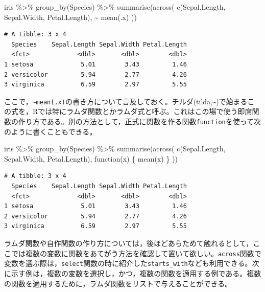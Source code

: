 \documentclass[
  a4paper,
]{ltjsbook}
\newenvironment{Shaded}{\begin{snugshade}}{\end{snugshade}}
\newcommand{\ControlFlowTok}[1]{\textcolor[rgb]{0.00,0.23,0.31}{#1}}
\newcommand{\FunctionTok}[1]{\textcolor[rgb]{0.28,0.35,0.67}{#1}}
\newcommand{\NormalTok}[1]{\textcolor[rgb]{0.00,0.23,0.31}{#1}}
\newcommand{\SpecialCharTok}[1]{\textcolor[rgb]{0.37,0.37,0.37}{#1}}
\begin{document}
\begin{Shaded}
\begin{Highlighting}[]
\NormalTok{iris }\SpecialCharTok{\%\textgreater{}\%}
  \FunctionTok{group\_by}\NormalTok{(Species) }\SpecialCharTok{\%\textgreater{}\%}
  \FunctionTok{summarise}\NormalTok{(}\FunctionTok{across}\NormalTok{(}
    \FunctionTok{c}\NormalTok{(Sepal.Length, Sepal.Width, Petal.Length),}
    \SpecialCharTok{\textasciitilde{}} \FunctionTok{mean}\NormalTok{(.x)}
\NormalTok{  ))}
\end{Highlighting}
\end{Shaded}

\begin{verbatim}
# A tibble: 3 x 4
  Species    Sepal.Length Sepal.Width Petal.Length
  <fct>             <dbl>       <dbl>        <dbl>
1 setosa             5.01        3.43         1.46
2 versicolor         5.94        2.77         4.26
3 virginica          6.59        2.97         5.55
\end{verbatim}

ここで，\texttt{\textasciitilde{}mean(.x)}の書き方について言及しておく。チルダ(tilda,\texttt{\textasciitilde{}})で始まるこの式を，Rでは特にラムダ関数とかラムダ式と呼ぶ。これはこの場で使う即席関数の作り方である。別の方法として，正式に関数を作る関数\texttt{function}を使って次のように書くこともできる。

\begin{Shaded}
\begin{Highlighting}[]
\NormalTok{iris }\SpecialCharTok{\%\textgreater{}\%}
  \FunctionTok{group\_by}\NormalTok{(Species) }\SpecialCharTok{\%\textgreater{}\%}
  \FunctionTok{summarise}\NormalTok{(}\FunctionTok{across}\NormalTok{(}
    \FunctionTok{c}\NormalTok{(Sepal.Length, Sepal.Width, Petal.Length),}
    \ControlFlowTok{function}\NormalTok{(x) \{}
      \FunctionTok{mean}\NormalTok{(x)}
\NormalTok{    \}}
\NormalTok{  ))}
\end{Highlighting}
\end{Shaded}

\begin{verbatim}
# A tibble: 3 x 4
  Species    Sepal.Length Sepal.Width Petal.Length
  <fct>             <dbl>       <dbl>        <dbl>
1 setosa             5.01        3.43         1.46
2 versicolor         5.94        2.77         4.26
3 virginica          6.59        2.97         5.55
\end{verbatim}

ラムダ関数や自作関数の作り方については，後ほどあらためて触れるとして，ここでは複数の変数に関数をあてがう方法を確認して置いて欲しい。\texttt{across}関数で変数を選ぶ際は，\texttt{select}関数の時に紹介した\texttt{starts\_with}なども利用できる。次に示す例は，複数の変数を選択し，かつ，複数の関数を適用する例である。複数の関数を適用するために，ラムダ関数をリストで与えることができる。
\end{document}
